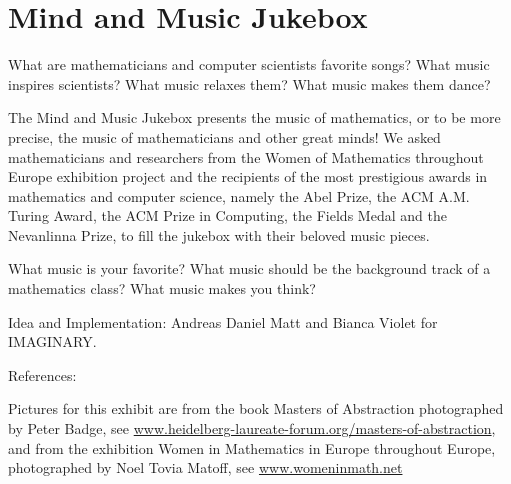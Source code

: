 \section{Mind and Music Jukebox}
What are mathematicians and computer scientists favorite songs? What music inspires scientists? What music relaxes them? What music makes them dance?

The Mind and Music Jukebox presents the music of mathematics, or to be more precise, the music of mathematicians and other great minds! We asked mathematicians and researchers from the Women of Mathematics throughout Europe exhibition project and the recipients of the most prestigious awards in mathematics and computer science, namely the Abel Prize, the ACM A.M. Turing Award, the ACM Prize in Computing, the Fields Medal and the Nevanlinna Prize, to fill the jukebox with their beloved music pieces.

What music is your favorite? What music should be the background track of a mathematics class? What music makes you think?

\vfill

Idea and Implementation: Andreas Daniel Matt and Bianca Violet for IMAGINARY.

References:

Pictures for this exhibit are from the book Masters of Abstraction photographed by Peter Badge, see \url{www.heidelberg-laureate-forum.org/masters-of-abstraction}, and from the exhibition Women in Mathematics in Europe throughout Europe, photographed by Noel Tovia Matoff, see \url{www.womeninmath.net}


